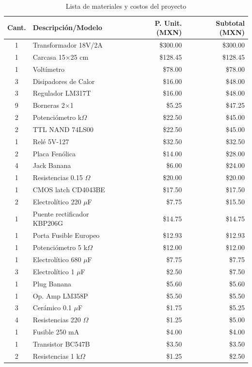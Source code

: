 \documentclass[pdflatex,sn-mathphys-num]{sn-jnl}%
\begin{document}
    
\begin{table}[htbp]
\caption{Lista de materiales y costos del proyecto}
\label{tab:bom}
\centering
\begin{tabular}{clrr}
\hline
\textbf{Cant.} & \textbf{Descripción/Modelo} & \textbf{P. Unit. (MXN)} & \textbf{Subtotal (MXN)} \\
\hline
1 & Transformador 18V/2A & \$300.00 & \$300.00 \\
1 & Carcasa 15$\times$25 cm & \$128.45 & \$128.45 \\
1 & Voltímetro & \$78.00 & \$78.00 \\
3 & Disipadores de Calor & \$16.00 & \$48.00 \\
3 & Regulador LM317T & \$16.00 & \$48.00 \\
9 & Borneras 2$\times$1 & \$5.25 & \$47.25 \\
2 & Potenciómetro k$\Omega$ & \$22.50 & \$45.00 \\
2 & TTL NAND 74LS00 & \$22.50 & \$45.00 \\
1 & Relé 5V-127 & \$32.50 & \$32.50 \\
2 & Placa Fenólica & \$14.00 & \$28.00 \\
4 & Jack Banana & \$6.00 & \$24.00 \\
1 & Resistencias 0.15 $\Omega$ & \$20.00 & \$20.00 \\
1 & CMOS latch CD4043BE & \$17.50 & \$17.50 \\
2 & Electrolítico 220 $\mu$F & \$7.75 & \$15.50 \\
1 & Puente rectificador KBP206G & \$14.75 & \$14.75 \\
1 & Porta Fusible Europeo & \$12.93 & \$12.93 \\
1 & Potenciómetro 5 k$\Omega$ & \$12.00 & \$12.00 \\
1 & Electrolítico 680 $\mu$F & \$7.75 & \$7.75 \\
3 & Electrolítico 1 $\mu$F & \$2.50 & \$7.50 \\
1 & Plug Banana & \$5.60 & \$5.60 \\
1 & Op. Amp LM358P & \$5.50 & \$5.50 \\
3 & Cerámico 0.1 $\mu$F & \$1.75 & \$5.25 \\
4 & Resistencias 220 $\Omega$ & \$1.25 & \$5.00 \\
1 & Fusible 250 mA & \$4.00 & \$4.00 \\
1 & Transistor BC547B & \$3.50 & \$3.50 \\
2 & Resistencias 1 k$\Omega$ & \$1.25 & \$2.50 \\

\end{tabular}
\end{table}
\end{document}
